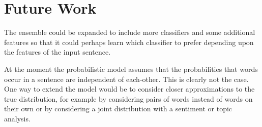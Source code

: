\section{Future Work}
\label{sec:future_work}

The ensemble could be expanded to include more classifiers and some additional
features so that it could perhaps learn which classifier to prefer depending
upon the features of the input sentence.

At the moment the probabilistic model assumes that the probabilities that words
occur in a sentence are independent of each-other. This is clearly not the case.
One way to extend the model would be to consider closer approximations to the
true distribution, for example by considering pairs of words instead of words on
their own or by considering a joint distribution with a sentiment or topic
analysis. 
